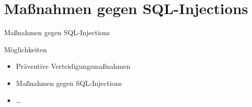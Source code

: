 \section{Maßnahmen gegen SQL-Injections}
\begin{frame}{Maßnahmen gegen SQL-Injections}
\begin{exampleblock}{Möglichkeiten}
\begin{itemize}
\item Präventive Verteidigungsmaßnahmen
\pause
\item Maßnahmen gegen SQL-Injections
\item \dots
\end{itemize}
\end{exampleblock}
\end{frame}
